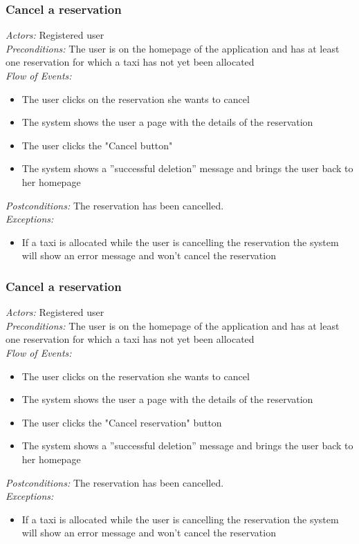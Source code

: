 \documentclass{article}
\begin{document}
	\subsubsection{Cancel a reservation}
	\textit{Actors:} Registered user
	\\\textit{Preconditions:} The user is on the homepage of the application and has at least one reservation for which a taxi has not yet been allocated
	\\\textit{Flow of Events:}
	\begin{itemize}
		\item  The user clicks on the reservation she wants to cancel
		\item  The system shows the user a page with the details of the reservation
		\item  The user clicks the "Cancel button"
		\item  The system shows a ''successful deletion'' message and brings the user back to her homepage
	\end{itemize}
	\textit{Postconditions:} The reservation has been cancelled.
	\\\textit{Exceptions:}
	\begin{itemize} 
		\item If a taxi is allocated while the user is cancelling the reservation the system will show an error message and won't cancel the reservation
	\end{itemize}
		
	\subsubsection{Cancel a reservation}
	\textit{Actors:} Registered user
	\\\textit{Preconditions:} The user is on the homepage of the application and has at least one reservation for which a taxi has not yet been allocated
	\\\textit{Flow of Events:}
	\begin{itemize}
		\item  The user clicks on the reservation she wants to cancel
		\item  The system shows the user a page with the details of the reservation
		\item  The user clicks the "Cancel reservation" button
		\item  The system shows a ''successful deletion'' message and brings the user back to her homepage
	\end{itemize}
	\textit{Postconditions:} The reservation has been cancelled.
	\\\textit{Exceptions:}
	\begin{itemize} 
		\item If a taxi is allocated while the user is cancelling the reservation the system will show an error message and won't cancel the reservation
	\end{itemize}
	
\end{document}
